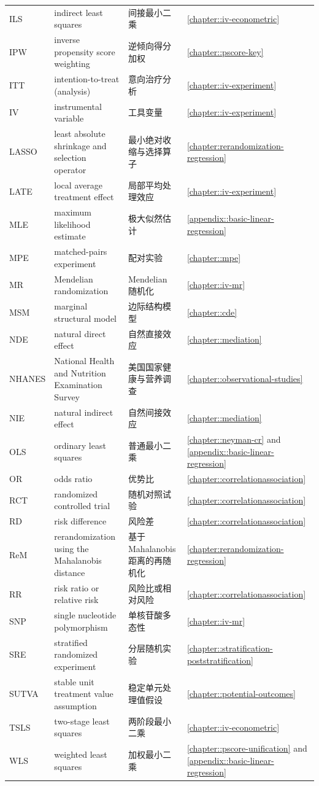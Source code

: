 \begin{tabular}{llll}
ILS & indirect least squares & 间接最小二乘 & \ref{chapter::iv-econometric} \\
IPW& inverse propensity score weighting & 逆倾向得分加权 & \ref{chapter::pscore-key}\\
ITT & intention-to-treat (analysis) & 意向治疗分析 & \ref{chapter::iv-experiment} \\
IV & instrumental variable & 工具变量 & \ref{chapter::iv-experiment} \\
LASSO & least absolute shrinkage and selection operator & 最小绝对收缩与选择算子 & \ref{chapter:rerandomization-regression}\\
LATE & local average treatment effect & 局部平均处理效应 & \ref{chapter::iv-experiment} \\
MLE & maximum likelihood estimate & 极大似然估计 & \ref{appendix::basic-linear-regression} \\
MPE & matched-pairs experiment & 配对实验 & \ref{chapter::mpe}\\
MR & Mendelian randomization & Mendelian 随机化 & \ref{chapter::iv-mr} \\
MSM & marginal structural model & 边际结构模型 & \ref{chapter::cde} \\
NDE& natural direct effect & 自然直接效应 & \ref{chapter::mediation} \\
NHANES & National Health and Nutrition Examination Survey & 美国国家健康与营养调查 & \ref{chapter::observational-studies}\\
NIE & natural indirect effect & 自然间接效应 & \ref{chapter::mediation} \\
OLS & ordinary least squares & 普通最小二乘 & \ref{chapter::neyman-cr} and \ref{appendix::basic-linear-regression}\\
OR & odds ratio & 优势比 & \ref{chapter::correlationassociation}\\
RCT & randomized controlled trial & 随机对照试验 & \ref{chapter::correlationassociation}\\
RD & risk difference & 风险差 & \ref{chapter::correlationassociation} \\
ReM & rerandomization using the Mahalanobis distance & 基于 Mahalanobis 距离的再随机化 & \ref{chapter:rerandomization-regression}\\
RR & risk ratio or relative risk & 风险比或相对风险 & \ref{chapter::correlationassociation}\\
SNP & single nucleotide polymorphism & 单核苷酸多态性 & \ref{chapter::iv-mr} \\
SRE& stratified randomized experiment & 分层随机实验 & \ref{chapter::stratification-poststratification}\\
SUTVA & stable unit treatment value assumption & 稳定单元处理值假设 & \ref{chapter::potential-outcomes} \\
TSLS & two-stage least squares & 两阶段最小二乘 & \ref{chapter::iv-econometric} \\
WLS & weighted least squares & 加权最小二乘 & \ref{chapter::pscore-unification} and \ref{appendix::basic-linear-regression}\\
\hline 
\end{tabular}
 
